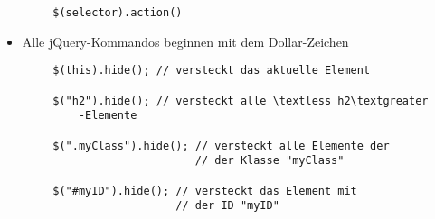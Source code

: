 \documentclass[10pt]{article}
\begin{document}
    \begin{tcolorbox}[
    colback=Red!5!white,
    colframe=Red!75!black,
    title={\centering Syntax}]
    \begin{lstlisting}
        $(selector).action()
    \end{lstlisting}
    \begin{itemize}
        \item Alle jQuery-Kommandos beginnen mit dem Dollar-Zeichen
    \end{itemize}
    \begin{lstlisting}
        $(this).hide(); // versteckt das aktuelle Element

        $("h2").hide(); // versteckt alle \textless h2\textgreater 
            -Elemente

        $(".myClass").hide(); // versteckt alle Elemente der
                              // der Klasse "myClass"

        $("#myID").hide(); // versteckt das Element mit
                           // der ID "myID"
    \end{lstlisting}
    \end{tcolorbox}
\end{document}
